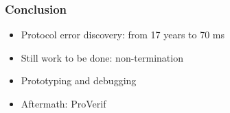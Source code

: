 \documentclass[10pt]{beamer}
\begin{document}
\begin{frame}
  \frametitle{Conclusion}

  \begin{itemize}
    \item Protocol error discovery: from 17 years to 70 ms
    \item Still work to be done: non-termination
    \item Prototyping and debugging
    \item Aftermath: ProVerif
  \end{itemize}
\end{frame}

{\aauwavesbg
\begin{frame}
\end{frame}}
\end{document}
